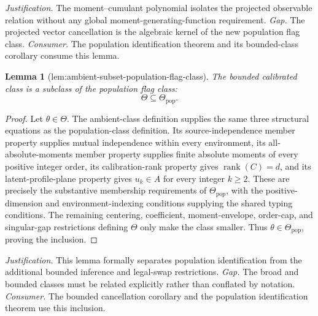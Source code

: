 \documentclass{article}
\newtheorem{lemma}{Lemma}
\begin{document}
\par\smallskip\noindent \textit{Justification.} The moment--cumulant polynomial isolates the projected observable relation without any global moment-generating-function requirement. \textit{Gap.} The projected vector cancellation is the algebraic kernel of the new population flag class. \textit{Consumer.} The population identification theorem and its bounded-class corollary consume this lemma.

\begin{lemma}[lem:ambient-subset-population-flag-class]\label{lem:ambient-subset-population-flag-class}
The bounded calibrated class is a subclass of the population flag class:
\[
 \Theta\subseteq\Theta_{\mathrm{pop}}.
\]
\end{lemma}
\begin{proof}
Let \(\theta\in\Theta\).  The ambient-class definition supplies the same three structural equations as the population-class definition.  Its source-independence member property supplies mutual independence within every environment, its all-absolute-moments member property supplies finite absolute moments of every positive integer order, its calibration-rank property gives \(\operatorname{rank}(C)=d\), and its latent-profile-plane property gives \(u_k\in A\) for every integer \(k\geq2\).  These are precisely the substantive membership requirements of \(\Theta_{\mathrm{pop}}\), with the positive-dimension and environment-indexing conditions supplying the shared typing conditions.  The remaining centering, coefficient, moment-envelope, order-cap, and singular-gap restrictions defining \(\Theta\) only make the class smaller.  Thus \(\theta\in\Theta_{\mathrm{pop}}\), proving the inclusion.
\end{proof}
\par\smallskip\noindent \textit{Justification.} This lemma formally separates population identification from the additional bounded inference and legal-swap restrictions. \textit{Gap.} The broad and bounded classes must be related explicitly rather than conflated by notation. \textit{Consumer.} The bounded cancellation corollary and the population identification theorem use this inclusion.
\end{document}
